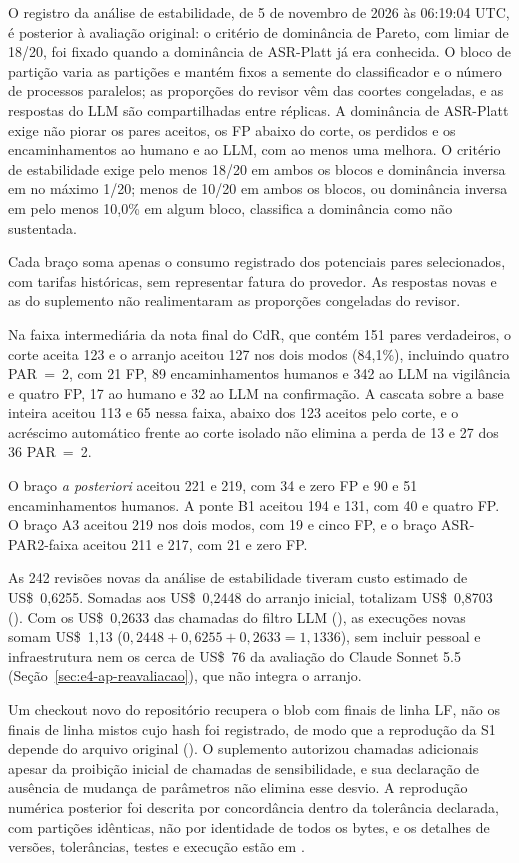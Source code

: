O registro da análise de estabilidade, de 5 de novembro de 2026 às 06:19:04 UTC, é posterior à avaliação original: o critério de dominância de Pareto, com limiar de 18/20, foi fixado quando a dominância de ASR-Platt já era conhecida. O bloco de partição varia as partições e mantém fixos a semente do classificador e o número de processos paralelos; as proporções do revisor vêm das coortes congeladas, e as respostas do LLM são compartilhadas entre réplicas. A dominância de ASR-Platt exige não piorar os pares aceitos, os FP abaixo do corte, os perdidos e os encaminhamentos ao humano e ao LLM, com ao menos uma melhora. O critério de estabilidade exige pelo menos 18/20 em ambos os blocos e dominância inversa em no máximo 1/20; menos de 10/20 em ambos os blocos, ou dominância inversa em pelo menos 10,0\% em algum bloco, classifica a dominância como não sustentada.

Cada braço soma apenas o consumo registrado dos potenciais pares selecionados, com tarifas históricas, sem representar fatura do provedor. As respostas novas e as do suplemento não realimentaram as proporções congeladas do revisor.

Na faixa intermediária da nota final do CdR, que contém 151 pares verdadeiros, o corte aceita 123 e o arranjo aceitou 127 nos dois modos (84,1\%), incluindo quatro PAR~=~2, com 21 FP, 89 encaminhamentos humanos e 342 ao LLM na vigilância e quatro FP, 17 ao humano e 32 ao LLM na confirmação. A cascata sobre a base inteira aceitou 113 e 65 nessa faixa, abaixo dos 123 aceitos pelo corte, e o acréscimo automático frente ao corte isolado não elimina a perda de 13 e 27 dos 36 PAR~=~2.

O braço \textit{a posteriori} aceitou 221 e 219, com 34 e zero FP e 90 e 51 encaminhamentos humanos. A ponte B1 aceitou 194 e 131, com 40 e quatro FP. O braço A3 aceitou 219 nos dois modos, com 19 e cinco FP, e o braço ASR-PAR2-faixa aceitou 211 e 217, com 21 e zero FP.

As 242 revisões novas da análise de estabilidade tiveram custo estimado de US\$~0,6255. Somadas aos US\$~0,2448 do arranjo inicial, totalizam US\$~0,8703 (). Com os US\$~0,2633 das chamadas do filtro LLM (), as execuções novas somam US\$~1,13 ($0{,}2448+0{,}6255+0{,}2633=1{,}1336$), sem incluir pessoal e infraestrutura nem os cerca de US\$~76 da avaliação do Claude Sonnet 5.5 (Seção~\ref{sec:e4-ap-reavaliacao}), que não integra o arranjo.

Um checkout novo do repositório recupera o blob com finais de linha LF, não os finais de linha mistos cujo hash foi registrado, de modo que a reprodução da S1 depende do arquivo original (). O suplemento autorizou chamadas adicionais apesar da proibição inicial de chamadas de sensibilidade, e sua declaração de ausência de mudança de parâmetros não elimina esse desvio. A reprodução numérica posterior foi descrita por concordância dentro da tolerância declarada, com partições idênticas, não por identidade de todos os bytes, e os detalhes de versões, tolerâncias, testes e execução estão em .

